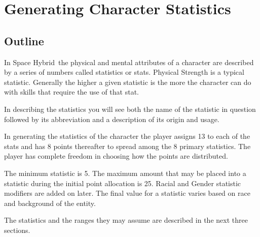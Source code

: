 \chapter{Generating Character Statistics}

\section{Outline}

In Space Hybrid\ the physical and mental attributes of a character 
are described by a series of numbers called statistics or stats. 
Physical Strength is a typical statistic. Generally the higher a
given statistic is the more the character can do with skills that 
require the use of that stat. 

In describing the statistics you will see both the name of the 
statistic in question followed by its abbreviation and a description of
its origin and usage. 

In generating the statistics of the character the player assigns 13 to
each of the stats and has 8 points thereafter to spread among
the 8 primary statistics. The player has complete freedom in choosing 
how the points are distributed.  

The minimum statistic is 5. The maximum amount that may be placed into
a statistic during the initial point allocation is 25. Racial and 
Gender statistic modifiers are added on later. The final value for a
statistic varies based on race and background of the entity.

The statistics and the ranges they may assume are described in the 
next three sections.

